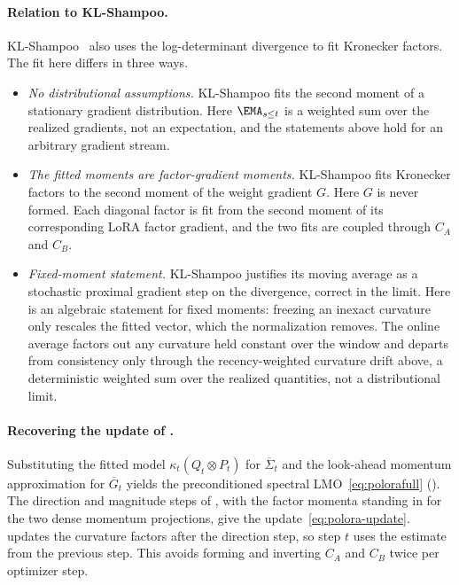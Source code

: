 \paragraph{Relation to KL-Shampoo.}
KL-Shampoo~\cite{klshampoo} also uses the log-determinant divergence to
fit Kronecker factors. The fit here differs in three ways.
\begin{itemize}[leftmargin=1.5em,itemsep=1pt,topsep=2pt]
  \item \emph{No distributional assumptions.} KL-Shampoo fits the second
  moment of a stationary gradient distribution. Here $\EMA_{s\le t}$ is a
  weighted sum over the realized gradients, not an expectation, and the
  statements above hold for an arbitrary gradient stream.
  \item \emph{The fitted moments are factor-gradient moments.} KL-Shampoo
  fits Kronecker factors to the second moment of the weight gradient $G$.
  Here $G$ is never formed. Each diagonal factor is fit from the second
  moment of its corresponding LoRA factor gradient, and the two fits are
  coupled through $C_A$ and $C_B$.
  \item \emph{Fixed-moment statement.} KL-Shampoo justifies its moving
  average as a stochastic proximal gradient step on the divergence, correct
  in the limit. Here  is an algebraic statement for
  fixed moments: freezing an inexact curvature only rescales the fitted
  vector, which the normalization removes. The online average factors out any
  curvature held constant over the window and departs from consistency only
  through the recency-weighted curvature drift above, a deterministic weighted
  sum over the realized quantities, not a distributional limit.
\end{itemize}

\paragraph{Recovering the update of .}
Substituting the fitted model $\kappa_t(Q_t\otimes P_t)$ for
$\overline\Sigma_t$ and the look-ahead momentum approximation for
$\overline G_t$ yields the preconditioned spectral
LMO~\eqref{eq:polorafull} (). The
direction and magnitude steps of , with the
factor momenta standing in for the two dense momentum projections, give
the update~\eqref{eq:polora-update}.  updates the
curvature factors after the direction step, so step $t$ uses the estimate
from the previous step. This avoids forming and inverting $C_A$ and
$C_B$ twice per optimizer step.

